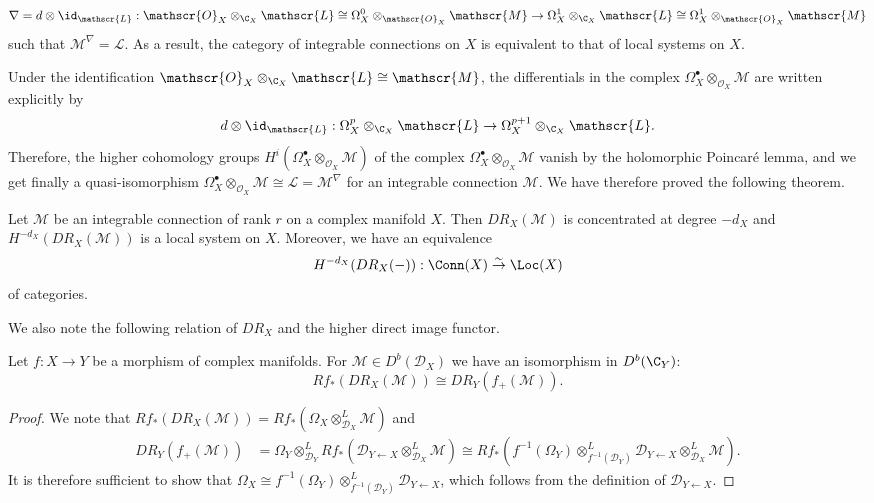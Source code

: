 \[\nabla=d\otimes\id_\mathscr{L}:\mathscr{O}_X\otimes_{\C_X}\mathscr{L}\cong\Omega_X^0\otimes_{\mathscr{O}_X}\mathscr{M}\to\Omega_X^1\otimes_{\C_X}\mathscr{L}\cong\Omega_X^1\otimes_{\mathscr{O}_X}\mathscr{M}\]
such that $\mathscr{M}^\nabla=\mathscr{L}$. As a result, the category of integrable connections on $X$ is equivalent to that of local systems on $X$.\par
Under the identification $\mathscr{O}_X\otimes_{\C_X}\mathscr{L}\cong\mathscr{M}$, the differentials in the complex $\Omega_X^\bullet\otimes_{\mathscr{O}_X}\mathscr{M}$ are written explicitly by
\[d\otimes\id_\mathscr{L}:\Omega_X^p\otimes_{\C_X}\mathscr{L}\to\Omega_X^{p+1}\otimes_{\C_X}\mathscr{L}.\]
Therefore, the higher cohomology groups $H^i(\Omega_X^\bullet\otimes_{\mathscr{O}_X}\mathscr{M})$ of the complex $\Omega_X^\bullet\otimes_{\mathscr{O}_X}\mathscr{M}$ vanish by the holomorphic Poincar\'e lemma, and we get finally a quasi-isomorphism $\Omega_X^\bullet\otimes_{\mathscr{O}_X}\mathscr{M}\cong\mathscr{L}=\mathscr{M}^\nabla$ for an integrable connection $\mathscr{M}$. We have therefore proved the following theorem.

\begin{theorem}\label{D-module analytic integral connection and local system}
Let $\mathscr{M}$ be an integrable connection of rank $r$ on a complex manifold $X$. Then $DR_X(\mathscr{M})$ is concentrated at degree $-d_X$ and $H^{-d_X}(DR_X(\mathscr{M}))$ is a local system on $X$. Moreover, we have an equivalence
\[H^{-d_X}(DR_X(-)):\Conn(X)\stackrel{\sim}{\to} \Loc(X)\]
of categories.
\end{theorem}

We also note the following relation of $DR_X$ and the higher direct image functor.
\begin{theorem}\label{D-module analytic DR_X and higher direct image}
Let $f:X\to Y$ be a morphism of complex manifolds. For $\mathscr{M}\in D^b(\mathscr{D}_X)$ we have an isomorphism in $D^b(\C_Y)$:
\[Rf_*(DR_X(\mathscr{M}))\cong DR_Y(f_+(\mathscr{M})).\]
\end{theorem}
\begin{proof}
We note that $Rf_*(DR_X(\mathscr{M}))=Rf_*(\Omega_X\otimes_{\mathscr{D}_X}^L\mathscr{M})$ and
\begin{align*}
DR_Y(f_+(\mathscr{M}))&=\Omega_Y\otimes_{\mathscr{D}_Y}^LRf_*(\mathscr{D}_{Y\leftarrow X}\otimes_{\mathscr{D}_X}^L\mathscr{M})\cong Rf_*(f^{-1}(\Omega_Y)\otimes_{f^{-1}(\mathscr{D}_Y)}^L\mathscr{D}_{Y\leftarrow X}\otimes_{\mathscr{D}_X}^L\mathscr{M}).
\end{align*}
It is therefore sufficient to show that $\Omega_X\cong f^{-1}(\Omega_Y)\otimes_{f^{-1}(\mathscr{D}_Y)}^L\mathscr{D}_{Y\leftarrow X}$, which follows from the definition of $\mathscr{D}_{Y\leftarrow X}$.
\end{proof}

